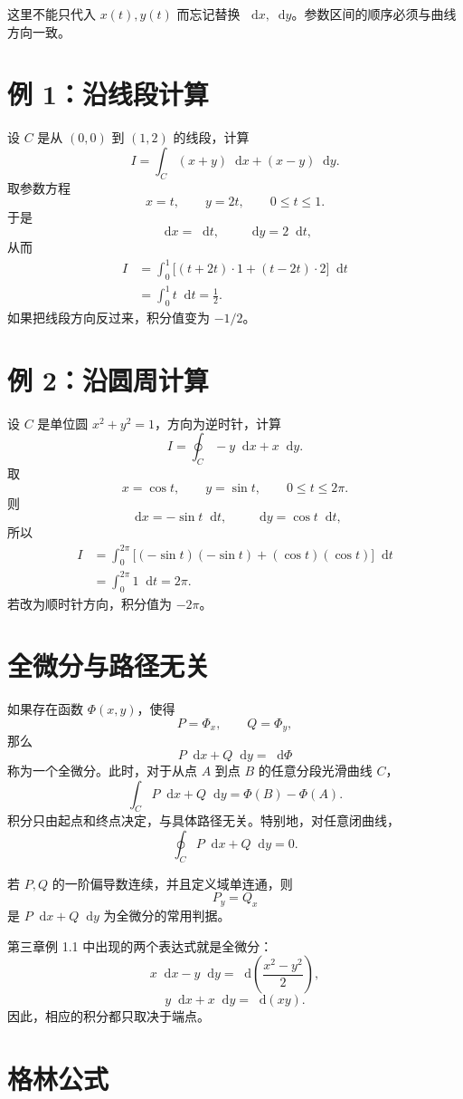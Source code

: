 \documentclass[UTF8,11pt]{ctexart}
\newcommand{\dif}{\mathop{}\!\mathrm{d}}
\begin{document}
这里不能只代入 $x(t),y(t)$ 而忘记替换 $\dif x,\dif y$。参数区间的顺序必须与曲线方向一致。

\section{例 1：沿线段计算}

设 $C$ 是从 $(0,0)$ 到 $(1,2)$ 的线段，计算
\[
I=\int_C(x+y)\dif x+(x-y)\dif y.
\]
取参数方程
\[
x=t,\qquad y=2t,\qquad 0\leq t\leq1.
\]
于是
\[
\dif x=\dif t,\qquad \dif y=2\dif t,
\]
从而
\[
\begin{aligned}
I
&=\int_0^1\big[(t+2t)\cdot1+(t-2t)\cdot2\big]\dif t\\
&=\int_0^1 t\dif t=\frac12.
\end{aligned}
\]
如果把线段方向反过来，积分值变为 $-1/2$。

\section{例 2：沿圆周计算}

设 $C$ 是单位圆 $x^2+y^2=1$，方向为逆时针，计算
\[
I=\oint_C-y\dif x+x\dif y.
\]
取
\[
x=\cos t,\qquad y=\sin t,\qquad 0\leq t\leq2\pi.
\]
则
\[
\dif x=-\sin t\dif t,\qquad
\dif y=\cos t\dif t,
\]
所以
\[
\begin{aligned}
I
&=\int_0^{2\pi}
\big[(-\sin t)(-\sin t)+(\cos t)(\cos t)\big]\dif t\\
&=\int_0^{2\pi}1\dif t=2\pi.
\end{aligned}
\]
若改为顺时针方向，积分值为 $-2\pi$。

\section{全微分与路径无关}

如果存在函数 $\Phi(x,y)$，使得
\[
P=\Phi_x,
\qquad
Q=\Phi_y,
\]
那么
\[
P\dif x+Q\dif y=\dif\Phi
\]
称为一个全微分。此时，对于从点 $A$ 到点 $B$ 的任意分段光滑曲线 $C$，
\[
\boxed{
\int_C P\dif x+Q\dif y=\Phi(B)-\Phi(A).
}
\]
积分只由起点和终点决定，与具体路径无关。特别地，对任意闭曲线，
\[
\oint_C P\dif x+Q\dif y=0.
\]

若 $P,Q$ 的一阶偏导数连续，并且定义域单连通，则
\[
P_y=Q_x
\]
是 $P\dif x+Q\dif y$ 为全微分的常用判据。

第三章例 1.1 中出现的两个表达式就是全微分：
\[
x\dif x-y\dif y
=\dif\left(\frac{x^2-y^2}{2}\right),
\]
\[
y\dif x+x\dif y=\dif(xy).
\]
因此，相应的积分都只取决于端点。

\section{格林公式}
\end{document}

